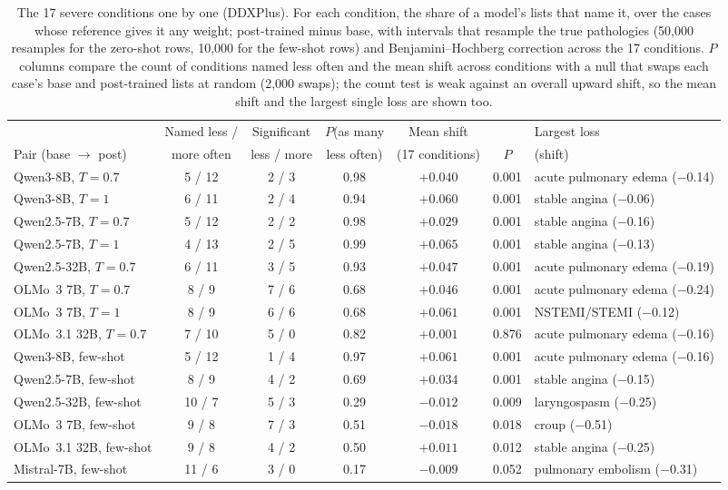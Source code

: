 \documentclass[11pt]{article}
\begin{document}
\begin{table}[t]
\centering\small
\begin{adjustbox}{max width=\linewidth}
\begin{tabular}{lcccccl}
\toprule
 & Named less / & Significant & $P$(as many & Mean shift & & Largest loss \\
Pair (base $\rightarrow$ post) & more often & less / more & less often) & (17 conditions) & $P$ & (shift) \\
\midrule
Qwen3-8B, $T{=}0.7$ & 5 / 12 & 2 / 3 & 0.98 & $+0.040$ & 0.001 & acute pulmonary edema ($-$0.14) \\
Qwen3-8B, $T{=}1$ & 6 / 11 & 2 / 4 & 0.94 & $+0.060$ & 0.001 & stable angina ($-$0.06) \\
Qwen2.5-7B, $T{=}0.7$ & 5 / 12 & 2 / 2 & 0.98 & $+0.029$ & 0.001 & stable angina ($-$0.16) \\
Qwen2.5-7B, $T{=}1$ & 4 / 13 & 2 / 5 & 0.99 & $+0.065$ & 0.001 & stable angina ($-$0.13) \\
Qwen2.5-32B, $T{=}0.7$ & 6 / 11 & 3 / 5 & 0.93 & $+0.047$ & 0.001 & acute pulmonary edema ($-$0.19) \\
OLMo~3 7B, $T{=}0.7$ & 8 / 9 & 7 / 6 & 0.68 & $+0.046$ & 0.001 & acute pulmonary edema ($-$0.24) \\
OLMo~3 7B, $T{=}1$ & 8 / 9 & 6 / 6 & 0.68 & $+0.061$ & 0.001 & NSTEMI/STEMI ($-$0.12) \\
OLMo~3.1 32B, $T{=}0.7$ & 7 / 10 & 5 / 0 & 0.82 & $+0.001$ & 0.876 & acute pulmonary edema ($-$0.16) \\
\midrule
Qwen3-8B, few-shot & 5 / 12 & 1 / 4 & 0.97 & $+0.061$ & 0.001 & acute pulmonary edema ($-$0.16) \\
Qwen2.5-7B, few-shot & 8 / 9 & 4 / 2 & 0.69 & $+0.034$ & 0.001 & stable angina ($-$0.15) \\
Qwen2.5-32B, few-shot & 10 / 7 & 5 / 3 & 0.29 & $-0.012$ & 0.009 & laryngospasm ($-$0.25) \\
OLMo~3 7B, few-shot & 9 / 8 & 7 / 3 & 0.51 & $-0.018$ & 0.018 & croup ($-$0.51) \\
OLMo~3.1 32B, few-shot & 9 / 8 & 4 / 2 & 0.50 & $+0.011$ & 0.012 & stable angina ($-$0.25) \\
Mistral-7B, few-shot & 11 / 6 & 3 / 0 & 0.17 & $-0.009$ & 0.052 & pulmonary embolism ($-$0.31) \\
\bottomrule
\end{tabular}
\end{adjustbox}
\caption{The 17 severe conditions one by one (DDXPlus). For each condition, the share of a model's lists that name it, over the cases whose reference gives it any weight; post-trained minus base, with intervals that resample the true pathologies (50,000 resamples for the zero-shot rows, 10,000 for the few-shot rows) and Benjamini--Hochberg correction across the 17 conditions. $P$ columns compare the count of conditions named less often and the mean shift across conditions with a null that swaps each case's base and post-trained lists at random (2,000 swaps); the count test is weak against an overall upward shift, so the mean shift and the largest single loss are shown too.}
\label{tab:severetest}
\end{table}
\end{document}
